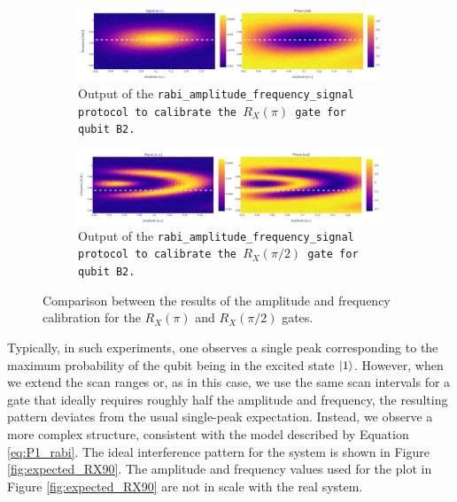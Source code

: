 \begin{figure}[h!]
    \centering
    \begin{subfigure}[t]{\textwidth}
        \includegraphics[width=\textwidth]{figures/png/RX90/RabiAmplitudeFrequency/B2.png}
        \caption{Output of the \tt{rabi\_amplitude\_frequency\_signal} protocol to calibrate the $R_X(\pi)$ gate for qubit \tt{B2}.}
        \label{fig:B2}
    \end{subfigure}
    \vspace{0.3cm}
    \begin{subfigure}[t]{\textwidth}
        \includegraphics[width=\textwidth]{figures/png/RX90/RabiAmplitudeFrequency/B2_90.png}
        \caption{Output of the \tt{rabi\_amplitude\_frequency\_signal} protocol to calibrate the $R_X(\pi/2)$ gate for qubit \tt{B2}.}
        \label{fig:B2_90}
    \end{subfigure}
    \caption{Comparison between the results of the amplitude and frequency calibration for the $R_X(\pi)$ and $R_X(\pi/2)$ gates.}
    \label{fig:af_comparison}
\end{figure}

Typically, in such experiments, one observes a single peak corresponding to the maximum probability of the qubit being in the excited state $\ket{1}$. 
However, when we extend the scan ranges or, as in this case, we use the same scan intervals for a gate that ideally requires roughly half the amplitude and frequency, the resulting pattern deviates from the usual single-peak expectation. 
Instead, we observe a more complex structure, consistent with the model described by Equation \ref{eq:P1_rabi}.
The ideal interference pattern for the system is shown in Figure \ref{fig:expected_RX90}. 
The amplitude and frequency values used for the plot in Figure \ref{fig:expected_RX90} are not in scale with the real system.

